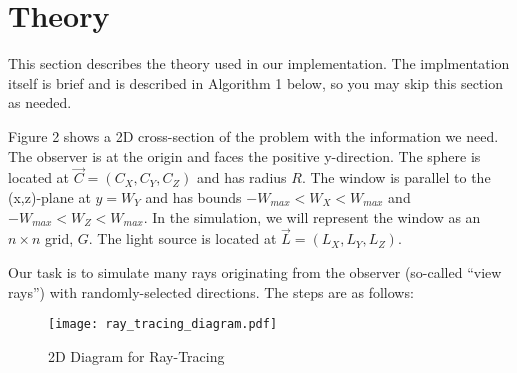 \documentclass{article}
\begin{document}
\newpage

\section{Theory}

This section describes the theory used in our implementation.  The
implmentation itself is brief and is described in Algorithm 1 below, so
you may skip this section as needed.

Figure 2 shows a 2D cross-section of the problem with the
information we need.  The observer is at the origin and faces the positive
y-direction.  The sphere is located at $\vec C = (C_X, C_Y, C_Z)$ and has
radius $R$. The window is parallel to the (x,z)-plane at $y=W_Y$ and has bounds
$-W_{max} < W_X < W_{max}$ and $-W_{max} < W_Z < W_{max}$.  In the simulation,
we will represent the window as an $n \times n$ grid, $G$. The light source
is located at $\vec L = (L_X, L_Y, L_Z)$.

Our task is to simulate many rays originating from the observer (so-called
``view rays'') with randomly-selected directions.  The steps are as follows:

\begin{figure}
  \label{FigComplex}
  \centering
  \texttt{[image: ray\_tracing\_diagram.pdf]}
  \caption{2D Diagram for Ray-Tracing}
\end{figure}
\end{document}
